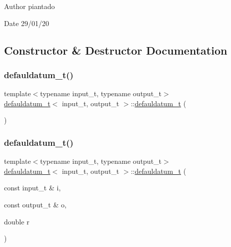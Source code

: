 \begin{DoxyAuthor}{Author}
piantado 
\end{DoxyAuthor}
\begin{DoxyDate}{Date}
29/01/20 
\end{DoxyDate}


\subsection{Constructor \& Destructor Documentation}
\mbox{\label{classdefauldatum__t_a60dbe7a244471992011e822a274111fb}} 
\subsubsection{\texorpdfstring{defauldatum\+\_\+t()}{defauldatum\_t()}\hspace{0.1cm}{\footnotesize\ttfamily [1/3]}}
{\footnotesize\ttfamily template$<$typename input\+\_\+t, typename output\+\_\+t$>$ \\
\hyperlink{classdefauldatum__t}{defauldatum\+\_\+t}$<$ input\+\_\+t, output\+\_\+t $>$\+::\hyperlink{classdefauldatum__t}{defauldatum\+\_\+t} (\begin{DoxyParamCaption}{ }\end{DoxyParamCaption})\hspace{0.3cm}{\ttfamily [inline]}}

\mbox{\label{classdefauldatum__t_aec837adfff605f08b75e8157f542fb90}} 
\subsubsection{\texorpdfstring{defauldatum\+\_\+t()}{defauldatum\_t()}\hspace{0.1cm}{\footnotesize\ttfamily [2/3]}}
{\footnotesize\ttfamily template$<$typename input\+\_\+t, typename output\+\_\+t$>$ \\
\hyperlink{classdefauldatum__t}{defauldatum\+\_\+t}$<$ input\+\_\+t, output\+\_\+t $>$\+::\hyperlink{classdefauldatum__t}{defauldatum\+\_\+t} (\begin{DoxyParamCaption}\item[{const input\+\_\+t \&}]{i,  }\item[{const output\+\_\+t \&}]{o,  }\item[{double}]{r }\end{DoxyParamCaption})\hspace{0.3cm}{\ttfamily [inline]}}

